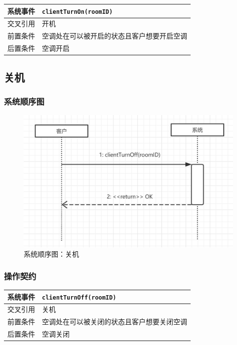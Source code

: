 \documentclass[black,normal,cn]{elegantnote}
\newcommand{\code}[1]{\colorbox{light-gray}{\texttt{#1}}}
\begin{document}
\begin{center}
    \begin{tabular}{|>{\centering}m{}|m{}|}
        \hline
        系统事件   & \multicolumn{1}{l|}{\code{clientTurnOn(roomID)}} \\
        \hline
        交叉引用   & 开机                                             \\
        \hline
        前置条件   & 空调处在可以被开启的状态且客户想要开启空调       \\
        \hline
        {后置条件} & 空调开启                                         \\
        \hline
    \end{tabular}
\end{center}

\subsection{关机}

\subsubsection{系统顺序图}

\begin{figure}[H]
    \centering
    \includegraphics[width=.8\textwidth]{fig/250008.png}
    \caption{系统顺序图：关机}
    \label{fig:250008}
\end{figure}

\subsubsection{操作契约}

\begin{center}
    \begin{tabular}{|>{\centering}m{}|m{}|}
        \hline
        系统事件   & \multicolumn{1}{l|}{\code{clientTurnOff(roomID)}} \\
        \hline
        交叉引用   & 关机                                              \\
        \hline
        前置条件   & 空调处在可以被关闭的状态且客户想要关闭空调        \\
        \hline
        {后置条件} & 空调关闭                                          \\
        \hline
    \end{tabular}
\end{center}
\end{document}
